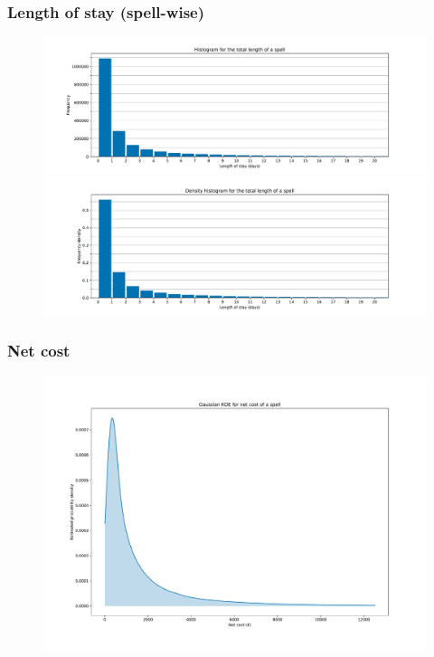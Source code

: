 \documentclass{beamer}
\begin{document}
\begin{frame}
    \frametitle{Length of stay (spell-wise)}

    \begin{figure}
        \begin{minipage}{\linewidth}
        \includegraphics[width=\linewidth]{./img/LOS_freq_hist.pdf}
        \end{minipage}
        \begin{minipage}{\linewidth}
        \includegraphics[width=\linewidth]{./img/LOS_density_hist.pdf}
        \end{minipage}
    \end{figure}
\end{frame}

\begin{frame}
    \frametitle{Net cost}

    \begin{figure}
        \includegraphics[width=\linewidth]{./img/netcost_kde.pdf}
    \end{figure}
\end{frame}
\end{document}
